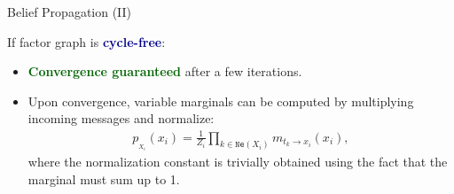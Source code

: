 \documentclass[10pt]{beamer}
\newcommand{\p}[1]{p_{_{#1}}} %
\newcommand{\noteB}[1]{\textbf{\textcolor{darkblue}{#1}}}
\newcommand{\noteR}[1]{\textbf{\textcolor{darkred}{#1}}}
\newcommand{\noteG}[1]{\textbf{\textcolor{darkgreen}{#1}}}
\newcommand{\mes}[2]{m_{#1\rightarrow#2}}
\newcommand{\Iset}[1]{\mathtt{#1}} %
\begin{document}
\begin{frame}{Belief Propagation (II)}

If factor graph is \noteB{cycle-free}:
\begin{itemize}
\item \noteG{Convergence guaranteed} after a few iterations.
\item Upon convergence, variable marginals can be computed by multiplying incoming messages and normalize:
\begin{align*}
\p{X_i}(x_i)=\frac{1}{Z_i}\prod_{k\in\Iset{Ne}(X_i)}\mes{t_k}{x_i}(x_i),
\end{align*}
where the normalization constant is trivially obtained using the fact that the marginal must sum up to 1. 
\end{itemize}


\end{frame}
\end{document}
